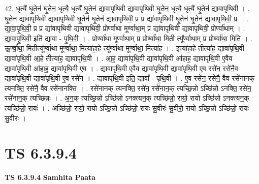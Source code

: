 \documentclass[17pt]{extarticle}
\begin{document}
42. धृत्यै॑ घृ॒तेन॑ घृ॒तेन॒ धृत्यै॒ धृत्यै॑ घृ॒तेन॑ द्यावापृथिवी द्यावापृथिवी घृ॒तेन॒ धृत्यै॒ धृत्यै॑ घृ॒तेन॑ द्यावापृथिवी । . घृ॒तेन॑ द्यावापृथिवी द्यावापृथिवी घृ॒तेन॑ घृ॒तेन॑ द्यावापृथिवी॒ प्र प्र द्या॑वापृथिवी घृ॒तेन॑ घृ॒तेन॑ द्यावापृथिवी॒ प्र । . द्या॒वा॒पृ॒थि॒वी॒ प्र प्र द्या॑वापृथिवी द्यावापृथिवी॒ प्रोर्ण्वा॑था मूर्ण्वाथा॒म् प्र द्या॑वापृथिवी द्यावापृथिवी॒ प्रोर्ण्वा॑थाम् । . द्या॒वा॒पृ॒थि॒वी॒ इति॑ द्यावा - पृ॒थि॒वी॒ । . प्रोर्ण्वा॑था मूर्ण्वाथा॒म् प्र प्रोर्ण्वा॑था॒ मिती त्यू᳚र्ण्वाथा॒म् प्र प्रोर्ण्वा॑था॒ मिति॑ । . ऊ॒र्ण्वा॒था॒ मितीत्यू᳚र्ण्वाथा मूर्ण्वाथा॒ मित्या॑हा॒हे त्यू᳚र्ण्वाथा मूर्ण्वाथा॒ मित्या॑ह । . इत्या॑हा॒हे तीत्या॑ह॒ द्यावा॑पृथि॒वी द्यावा॑पृथि॒वी आ॒हे तीत्या॑ह॒ द्यावा॑पृथि॒वी । . आ॒ह॒ द्यावा॑पृथि॒वी द्यावा॑पृथि॒वी आ॑हाह॒ द्यावा॑पृथि॒वी ए॒वैव द्यावा॑पृथि॒वी आ॑हाह॒ द्यावा॑पृथि॒वी ए॒व । . द्यावा॑पृथि॒वी ए॒वैव द्यावा॑पृथि॒वी द्यावा॑पृथि॒वी ए॒व रसे॑न॒ रसे॑नै॒व द्यावा॑पृथि॒वी द्यावा॑पृथि॒वी ए॒व रसे॑न । . द्यावा॑पृथि॒वी इति॒ द्यावा᳚ - पृ॒थि॒वी । . ए॒व रसे॑न॒ रसे॑नै॒ वैव रसे॑नानक् त्यनक्ति॒ रसे॑नै॒ वैव रसे॑नानक्ति । . रसे॑नानक् त्यनक्ति॒ रसे॑न॒ रसे॑नान॒क् त्यच्छि॒न्नो ऽच्छि॑न्नो ऽनक्ति॒ रसे॑न॒ रसे॑नान॒क् त्यच्छि॑न्नः । . अ॒न॒क् त्यच्छि॒न्नो ऽच्छि॑न्नो ऽनक्त्यन॒क् त्यच्छि॑न्नो॒ रायो॒ रायो ऽच्छि॑न्नो ऽनक्त्यन॒क् त्यच्छि॑न्नो॒ रायः॑ । . अच्छि॑न्नो॒ रायो॒ रायो ऽच्छि॒न्नो ऽच्छि॑न्नो॒ रायः॑ सु॒वीरः॑ सु॒वीरो॒ रायो ऽच्छि॒न्नो ऽच्छि॑न्नो॒ रायः॑ सु॒वीरः॑ । \newline
\pagebreak
{}

\section{ TS 6.3.9.4 }

\textbf{TS 6.3.9.4 } \newline
\textbf{Samhita Paata} \newline
\end{document}
